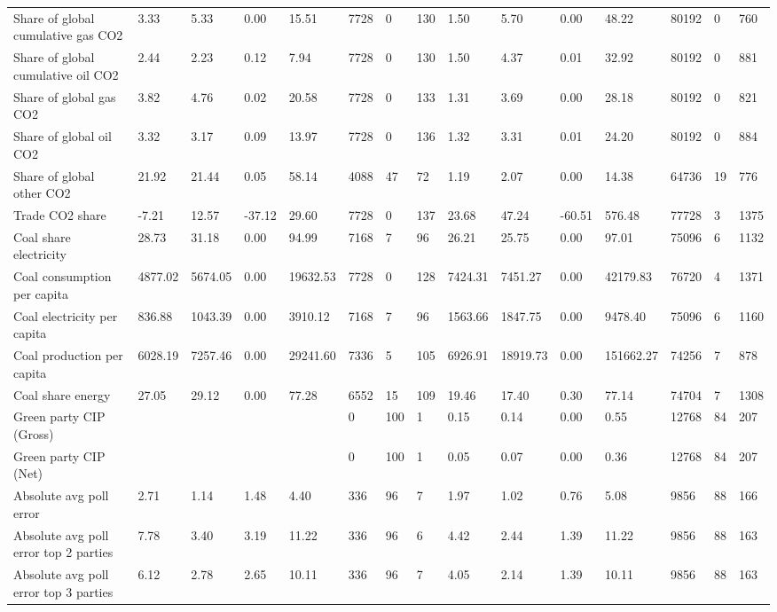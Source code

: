 \begin{longtable}{lllllllllllllll}
Share of global cumulative gas CO2 & 3.33 & 5.33 & 0.00 & 15.51 & 7728 & 0 & 130 & 1.50 & 5.70 & 0.00 & 48.22 & 80192 & 0 & 760\\
Share of global cumulative oil CO2 & 2.44 & 2.23 & 0.12 & 7.94 & 7728 & 0 & 130 & 1.50 & 4.37 & 0.01 & 32.92 & 80192 & 0 & 881\\
\addlinespace
Share of global gas CO2 & 3.82 & 4.76 & 0.02 & 20.58 & 7728 & 0 & 133 & 1.31 & 3.69 & 0.00 & 28.18 & 80192 & 0 & 821\\
Share of global oil CO2 & 3.32 & 3.17 & 0.09 & 13.97 & 7728 & 0 & 136 & 1.32 & 3.31 & 0.01 & 24.20 & 80192 & 0 & 884\\
Share of global other CO2 & 21.92 & 21.44 & 0.05 & 58.14 & 4088 & 47 & 72 & 1.19 & 2.07 & 0.00 & 14.38 & 64736 & 19 & 776\\
Trade CO2 share & -7.21 & 12.57 & -37.12 & 29.60 & 7728 & 0 & 137 & 23.68 & 47.24 & -60.51 & 576.48 & 77728 & 3 & 1375\\
Coal share electricity & 28.73 & 31.18 & 0.00 & 94.99 & 7168 & 7 & 96 & 26.21 & 25.75 & 0.00 & 97.01 & 75096 & 6 & 1132\\
\addlinespace
Coal consumption per capita & 4877.02 & 5674.05 & 0.00 & 19632.53 & 7728 & 0 & 128 & 7424.31 & 7451.27 & 0.00 & 42179.83 & 76720 & 4 & 1371\\
Coal electricity per capita & 836.88 & 1043.39 & 0.00 & 3910.12 & 7168 & 7 & 96 & 1563.66 & 1847.75 & 0.00 & 9478.40 & 75096 & 6 & 1160\\
Coal production per capita & 6028.19 & 7257.46 & 0.00 & 29241.60 & 7336 & 5 & 105 & 6926.91 & 18919.73 & 0.00 & 151662.27 & 74256 & 7 & 878\\
Coal share energy & 27.05 & 29.12 & 0.00 & 77.28 & 6552 & 15 & 109 & 19.46 & 17.40 & 0.30 & 77.14 & 74704 & 7 & 1308\\
Green party CIP (Gross) &  &  &  &  & 0 & 100 & 1 & 0.15 & 0.14 & 0.00 & 0.55 & 12768 & 84 & 207\\
\addlinespace
Green party CIP (Net) &  &  &  &  & 0 & 100 & 1 & 0.05 & 0.07 & 0.00 & 0.36 & 12768 & 84 & 207\\
Absolute avg poll error & 2.71 & 1.14 & 1.48 & 4.40 & 336 & 96 & 7 & 1.97 & 1.02 & 0.76 & 5.08 & 9856 & 88 & 166\\
Absolute avg poll error top 2 parties & 7.78 & 3.40 & 3.19 & 11.22 & 336 & 96 & 6 & 4.42 & 2.44 & 1.39 & 11.22 & 9856 & 88 & 163\\
Absolute avg poll error top 3 parties & 6.12 & 2.78 & 2.65 & 10.11 & 336 & 96 & 7 & 4.05 & 2.14 & 1.39 & 10.11 & 9856 & 88 & 163\\

\end{longtable}
